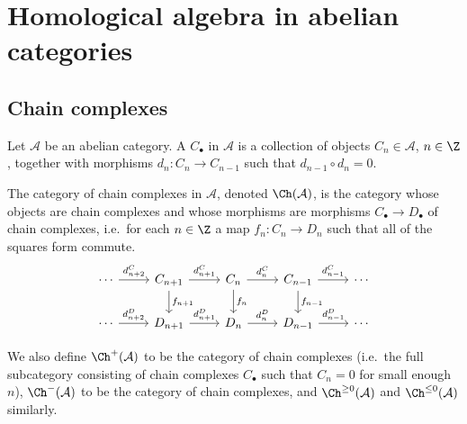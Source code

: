 \documentclass[main.tex]{subfiles}
\begin{document}
\chapter{Homological algebra in abelian categories}
\label{ch:homological_algebra_in_abelian_categories}

\section{Chain complexes}
\label{ssc:chain_complexes}

\begin{definition}
  \label{def:category_of_chain_complexes_abelian}
  Let $\mathcal{A}$ be an abelian category. A  $C_{\bullet}$ in $\mathcal{A}$ is a collection of objects $C_{n} \in \mathcal{A}$, $n \in \Z$, together with morphisms $d_{n}\colon C_{n} \to C_{n-1}$ such that $d_{n-1} \circ d_{n} = 0$.

  The category of chain complexes in $\mathcal{A}$, denoted $\Ch(\mathcal{A})$, is the category whose objects are chain complexes and whose morphisms are morphisms $C_{\bullet} \to D_{\bullet}$ of chain complexes, i.e.\ for each $n \in \Z$ a map $f_{n}\colon C_{n} \to D_{n}$ such that all of the squares form commute.
  \begin{equation*}
    \begin{tikzcd}
      \cdots
      \arrow[r, "d^{C}_{n+2}"]
      & C_{n+1}
      \arrow[r, "d^{C}_{n+1}"]
      \arrow[d, "f_{n+1}"]
      & C_{n}
      \arrow[r, "d^{C}_{n}"]
      \arrow[d, "f_{n}"]
      & C_{n-1}
      \arrow[r, "d^{C}_{n-1}"]
      \arrow[d, "f_{n-1}"]
      & \cdots
      \\
      \cdots
      \arrow[r, "d^{D}_{n+2}"]
      & D_{n+1}
      \arrow[r, "d^{D}_{n+1}"]
      & D_{n}
      \arrow[r, "d^{D}_{n}"]
      & D_{n-1}
      \arrow[r, "d^{D}_{n-1}"]
      & \cdots
    \end{tikzcd}
  \end{equation*}

  We also define $\Ch^{+}(\mathcal{A})$ to be the category of  chain complexes (i.e.\ the full subcategory consisting of chain complexes $C_{\bullet}$ such that $C_{n} = 0$ for small enough $n$), $\Ch^{-}(\mathcal{A})$ to be the category of  chain complexes, and $\Ch^{\geq 0}(\mathcal{A})$ and $\Ch^{\leq 0}(\mathcal{A})$ similarly.
\end{definition}
\end{document}
